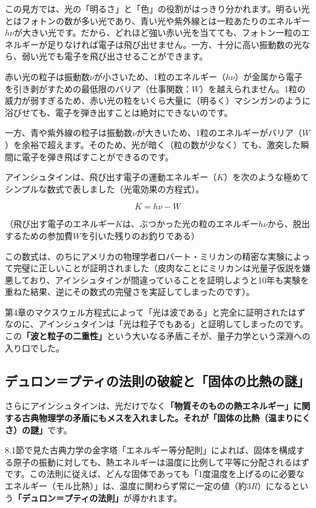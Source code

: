 この見方では、光の「明るさ」と「色」の役割がはっきり分かれます。明るい光とはフォトンの数が多い光であり、青い光や紫外線とは一粒あたりのエネルギー\(h\nu\)が大きい光です。だから、どれほど強い赤い光を当てても、フォトン一粒のエネルギーが足りなければ電子は飛び出せません。一方、十分に高い振動数の光なら、弱い光でも電子を飛び出させることができます。

赤い光の粒子は振動数\(\nu\)が小さいため、1粒のエネルギー（\(h\nu\)）が金属から電子を引き剥がすための最低限のバリア（仕事関数：\(W\)）を越えられません。1粒の威力が弱すぎるため、赤い光の粒をいくら大量に（明るく）マシンガンのように浴びせても、電子を弾き出すことは絶対にできないのです。

一方、青や紫外線の粒子は振動数\(\nu\)が大きいため、1粒のエネルギーがバリア（\(W\)）を余裕で超えます。そのため、光が暗く（粒の数が少なく）ても、激突した瞬間に電子を弾き飛ばすことができるのです。

アインシュタインは、飛び出す電子の運動エネルギー（\(K\)）を次のような極めてシンプルな数式で表しました（光電効果の方程式）。

\[K = h\nu - W\]

（飛び出す電子のエネルギー\(K\)は、ぶつかった光の粒のエネルギー\(h\nu\)から、脱出するための参加費\(W\)を引いた残りのお釣りである）

この数式は、のちにアメリカの物理学者ロバート・ミリカンの精密な実験によって完璧に正しいことが証明されました（皮肉なことにミリカンは光量子仮説を嫌悪しており、アインシュタインが間違っていることを証明しようと10年も実験を重ねた結果、逆にその数式の完璧さを実証してしまったのです）。

第4章のマクスウェル方程式によって「光は波である」と完全に証明されたはずなのに、アインシュタインは「光は粒子でもある」と証明してしまったのです。この\textbf{「波と粒子の二重性」}という大いなる矛盾こそが、量子力学という深淵への入り口でした。

\subsection{デュロン＝プティの法則の破綻と「固体の比熱の謎」}

さらにアインシュタインは、光だけでなく\textbf{「物質そのものの熱エネルギー」に関する古典物理学の矛盾にもメスを入れました。それが「固体の比熱（温まりにくさ）の謎」}です。

8.1節で見た古典力学の金字塔「エネルギー等分配則」によれば、固体を構成する原子の振動に対しても、熱エネルギーは温度に比例して平等に分配されるはずです。この法則に従えば、どんな固体であっても「1度温度を上げるのに必要なエネルギー（モル比熱）」は、温度に関わらず常に一定の値（約\(3R\)）になるという\textbf{「デュロン＝プティの法則」}が導かれます。

